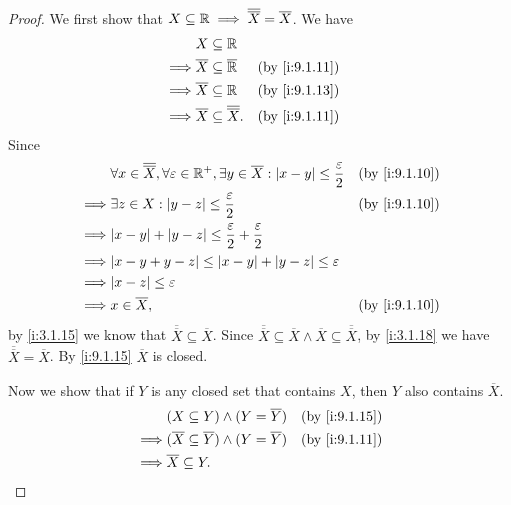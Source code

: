 \begin{proof}
  We first show that \(X \subseteq \mathbb{R} \implies \overline{\overline{X}} = \overline{X}\).
  We have
  \begin{align*}
             & X \subseteq \R                                                     \\
    \implies & \overline{X} \subseteq \overline{\R}            &  & \by{i:9.1.11} \\
    \implies & \overline{X} \subseteq \R                       &  & \by{i:9.1.13} \\
    \implies & \overline{X} \subseteq \overline{\overline{X}}. &  & \by{i:9.1.11}
  \end{align*}
  Since
  \begin{align*}
             & \forall x \in \overline{\overline{X}}, \forall \varepsilon \in \R^+, \exists y \in \overline{X} : \abs{x - y} \leq \dfrac{\varepsilon}{2} &  & \by{i:9.1.10} \\
    \implies & \exists z \in X : \abs{y - z} \leq \dfrac{\varepsilon}{2}                                                                                 &  & \by{i:9.1.10} \\
    \implies & \abs{x - y} + \abs{y - z} \leq \dfrac{\varepsilon}{2} + \dfrac{\varepsilon}{2}                                                                               \\
    \implies & \abs{x - y + y - z} \leq \abs{x - y} + \abs{y - z} \leq \varepsilon                                                                                          \\
    \implies & \abs{x - z} \leq \varepsilon                                                                                                                                 \\
    \implies & x \in \overline{X},                                                                                                                       &  & \by{i:9.1.10}
  \end{align*}
  by \cref{i:3.1.15} we know that \(\overline{\overline{X}} \subseteq \overline{X}\).
  Since \(\overline{\overline{X}} \subseteq \overline{X} \land \overline{X} \subseteq \overline{\overline{X}}\), by \cref{i:3.1.18} we have \(\overline{\overline{X}} = \overline{X}\).
  By \cref{i:9.1.15} \(\overline{X}\) is closed.

  Now we show that if \(Y\) is any closed set that contains \(X\), then \(Y\) also contains \(\overline{X}\).
  \begin{align*}
             & (X \subseteq Y) \land (Y = \overline{Y})                       &  & \by{i:9.1.15} \\
    \implies & (\overline{X} \subseteq \overline{Y}) \land (Y = \overline{Y}) &  & \by{i:9.1.11} \\
    \implies & \overline{X} \subseteq Y.
  \end{align*}
\end{proof}

